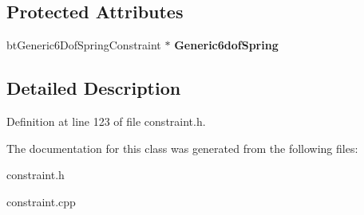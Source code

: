 \subsection*{Protected Attributes}
\begin{DoxyCompactItemize}
\item 
\hypertarget{classphys_1_1Generic6DofSpringConstraint_aaa3b34568d2402155270c102e4719c07}{
btGeneric6DofSpringConstraint $\ast$ {\bfseries Generic6dofSpring}}
\label{d1/dc7/classphys_1_1Generic6DofSpringConstraint_aaa3b34568d2402155270c102e4719c07}

\end{DoxyCompactItemize}


\subsection{Detailed Description}


Definition at line 123 of file constraint.h.



The documentation for this class was generated from the following files:\begin{DoxyCompactItemize}
\item 
constraint.h\item 
constraint.cpp\end{DoxyCompactItemize}
